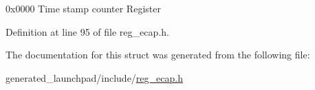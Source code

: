 0x0000 Time stamp counter Register 

Definition at line 95 of file reg\+\_\+ecap.\+h.



The documentation for this struct was generated from the following file\+:\begin{DoxyCompactItemize}
\item 
generated\+\_\+launchpad/include/\mbox{\hyperlink{reg__ecap_8h}{reg\+\_\+ecap.\+h}}\end{DoxyCompactItemize}
